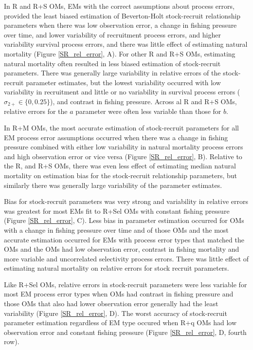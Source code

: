 \documentclass[
  12pt,
]{article}
\begin{document}
In R and R+S OMs, EMs with the correct assumptions about process errors,
provided the least biased estimation of Beverton-Holt stock-recruit
relationship parameters when there was low observation error, a change
in fishing pressure over time, and lower variability of recruitment
process errors, and higher variability survival process errors, and
there was little effect of estimating natural mortality (Figure
\ref{SR_rel_error}, A). For other R and R+S OMs, estimating natural
mortality often resulted in less biased estimation of stock-recruit
parameters. There was generally large variability in relative errors of
the stock-recruit parameter estimates, but the lowest variability
occurred with low variability in recruitment and little or no
variability in survival process errors (\(\sigma_{2+} \in \{0,0.25\}\)),
and contrast in fishing pressure. Across al R and R+S OMs, relative
errors for the \(a\) parameter were often less variable than those for
\(b\).

In R+M OMs, the most accurate estimation of stock-recruit parameters for
all EM process error assumptions occurred when there was a change in
fishing pressure combined with either low variability in natural
mortality process errors and high observation error or vice versa
(Figure \ref{SR_rel_error}, B). Relative to the R, and R+S OMs, there
was even less effect of estimating median natural mortality on
estimation bias for the stock-recruit relationship parameters, but
similarly there was generally large variability of the parameter
estimates.

Bias for stock-recruit parameters was very strong and variability in
relative errors was greatest for most EMs fit to R+Sel OMs with constant
fishing pressure (Figure \ref{SR_rel_error}, C). Less bias in parameter
estimation occurred for OMs with a change in fishing pressure over time
and of those OMs and the most accurate estimation occurred for EMs with
process error types that matched the OMs and the OMs had low observation
error, contrast in fishing mortality and more variable and uncorrelated
selectivity process errors. There was little effect of estimating
natural mortality on relative errors for stock recruit parameters.

Like R+Sel OMs, relative errors in stock-recruit parameters were less
variable for most EM process error types when OMs had contrast in
fishing pressure and those OMs that also had lower observation error
generally had the least variability (Figure \ref{SR_rel_error}, D). The
worst accuracy of stock-recruit parameter estimation regardless of EM
type occured when R+q OMs had low observation error and constant fishing
pressure (Figure \ref{SR_rel_error}, D, fourth row).
\end{document}
